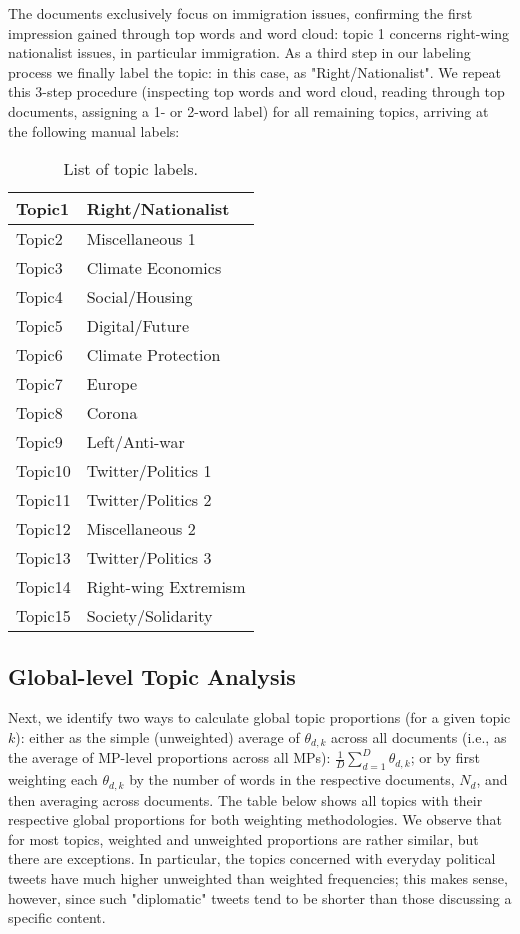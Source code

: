 \documentclass[12pt]{article}
\begin{document}
The documents exclusively focus on immigration issues, confirming the first impression gained through top words and word cloud: topic 1 concerns right-wing nationalist issues, in particular immigration. As a third step in our labeling process we finally label the topic: in this case, as "Right/Nationalist". We repeat this 3-step procedure (inspecting top words and word cloud, reading through top documents, assigning a 1- or 2-word label) for all remaining topics, arriving at the following manual labels:

\begin{table}[h!]
	\centering
	\captionsetup{justification=centering,margin=2cm}
	\begin{tabular}{|l|l|}
	\hline
	Topic1  & Right/Nationalist    \\ \hline
	Topic2  & Miscellaneous 1      \\ \hline
	Topic3  & Climate Economics    \\ \hline
	Topic4  & Social/Housing       \\ \hline
	Topic5  & Digital/Future       \\ \hline
	Topic6  & Climate Protection   \\ \hline
	Topic7  & Europe               \\ \hline
	Topic8  & Corona               \\ \hline
	Topic9  & Left/Anti-war        \\ \hline
	Topic10 & Twitter/Politics 1   \\ \hline
	Topic11 & Twitter/Politics 2   \\ \hline
	Topic12 & Miscellaneous 2      \\ \hline
	Topic13 & Twitter/Politics 3   \\ \hline
	Topic14 & Right-wing Extremism \\ \hline
	Topic15 & Society/Solidarity   \\ \hline
	\end{tabular}
	\caption{List of topic labels.}
	\label{Tab:labels}
\end{table}

\subsection{Global-level Topic Analysis}

Next, we identify two ways to calculate global topic proportions (for a given topic $k$): either as the simple (unweighted) average of $\theta_{d,k}$ across all documents (i.e., as the average of MP-level proportions across all MPs): $\frac{1}{D}\sum_{d=1}^{D}\theta_{d,k}$; or by first weighting each $\theta_{d,k}$ by the number of words in the respective documents, $N_d$, and then averaging across documents. The table below shows all topics with their respective global proportions for both weighting methodologies. We observe that for most topics, weighted and unweighted proportions are rather similar, but there are exceptions. In particular, the topics concerned with everyday political tweets have much higher unweighted than weighted frequencies; this makes sense, however, since such "diplomatic" tweets tend to be shorter than those discussing a specific content.
\end{document}
